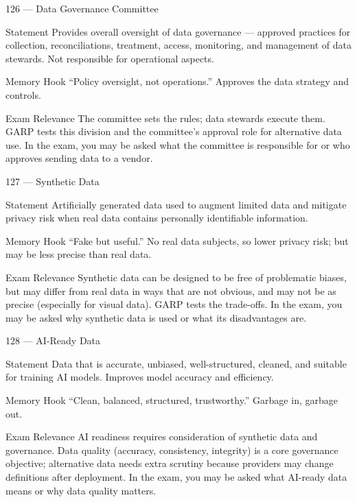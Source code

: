 \documentclass[aspectratio=169,8pt]{beamer}
\begin{document}
	\begin{frame}{126 --- Data Governance Committee}
		\begin{block}{Statement}
			Provides overall oversight of data governance --- approved practices for collection, reconciliations, treatment, access, monitoring, and management of data stewards. Not responsible for operational aspects.
		\end{block}
		\begin{block}{Memory Hook}
			``Policy oversight, not operations.'' Approves the data strategy and controls.
		\end{block}
		\begin{block}{Exam Relevance}
			The committee sets the rules; data stewards execute them. GARP tests this division and the committee's approval role for alternative data use. In the exam, you may be asked what the committee is responsible for or who approves sending data to a vendor.
		\end{block}
	\end{frame}
	
	\begin{frame}{127 --- Synthetic Data}
		\begin{block}{Statement}
			Artificially generated data used to augment limited data and mitigate privacy risk when real data contains personally identifiable information.
		\end{block}
		\begin{block}{Memory Hook}
			``Fake but useful.'' No real data subjects, so lower privacy risk; but may be less precise than real data.
		\end{block}
		\begin{block}{Exam Relevance}
			Synthetic data can be designed to be free of problematic biases, but may differ from real data in ways that are not obvious, and may not be as precise (especially for visual data). GARP tests the trade-offs. In the exam, you may be asked why synthetic data is used or what its disadvantages are.
		\end{block}
	\end{frame}
	
	\begin{frame}{128 --- AI-Ready Data}
		\begin{block}{Statement}
			Data that is accurate, unbiased, well-structured, cleaned, and suitable for training AI models. Improves model accuracy and efficiency.
		\end{block}
		\begin{block}{Memory Hook}
			``Clean, balanced, structured, trustworthy.'' Garbage in, garbage out.
		\end{block}
		\begin{block}{Exam Relevance}
			AI readiness requires consideration of synthetic data and governance. Data quality (accuracy, consistency, integrity) is a core governance objective; alternative data needs extra scrutiny because providers may change definitions after deployment. In the exam, you may be asked what AI-ready data means or why data quality matters.
		\end{block}
	\end{frame}
	
\end{document}

